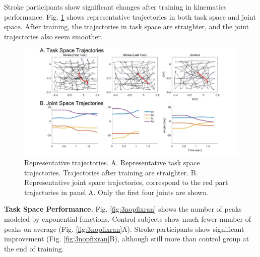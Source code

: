 Stroke participants show significant changes after training in kinematics performance.
Fig. \ref{fig:2stroketrajexamp} shows representative trajectories in both task space and joint space. 
After training, the trajectories in task space are straighter, and the joint trajectories also seem smoother. 


\begin{figure}
	\centering
	\includegraphics[width=1\linewidth]{figures/2strokeTrajExamp}
	\caption[Example trajectories]
	{Representative trajectories. 
		A. Representative task space trajectories. Trajectories after training are straighter.
		B. Representative joint space trajectories, correspond to the red part trajectories in panel A. Only the first four joints are shown.}
	\label{fig:2stroketrajexamp}
\end{figure}

\textbf{Task Space Performance.}
Fig. \ref{fig:3nopfixran} shows the number of peaks modeled by exponential functions.
Control subjects show much fewer number of peaks on average (Fig. \ref{fig:3nopfixran}A).
Stroke participants show significant improvement (Fig. \ref{fig:3nopfixran}B), although still more than control group at the end of training.


